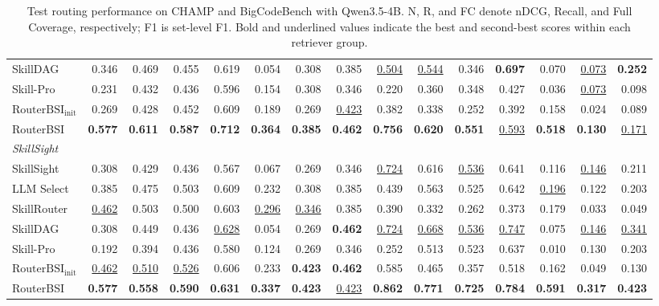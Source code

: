 \begin{table}[t]
\begin{tabular*}{\textwidth}{@{\extracolsep{\fill}}lrrrrrrrrrrrrrr@{}}
SkillDAG & 0.346 & 0.469 & 0.455 & 0.619 & 0.054 & 0.308 & 0.385 & \underline{0.504} & \underline{0.544} & 0.346 & \textbf{0.697} & 0.070 & \underline{0.073} & \textbf{0.252} \\
Skill-Pro & 0.231 & 0.432 & 0.436 & 0.596 & 0.154 & 0.308 & 0.346 & 0.220 & 0.360 & 0.348 & 0.427 & 0.036 & \underline{0.073} & 0.098 \\
$\mathrm{RouterBSI}_{\mathrm{init}}$ & 0.269 & 0.428 & 0.452 & 0.609 & 0.189 & 0.269 & \underline{0.423} & 0.382 & 0.338 & 0.252 & 0.392 & 0.158 & 0.024 & 0.089 \\
RouterBSI & \textbf{0.577} & \textbf{0.611} & \textbf{0.587} & \textbf{0.712} & \textbf{0.364} & \textbf{0.385} & \textbf{0.462} & \textbf{0.756} & \textbf{0.620} & \textbf{0.551} & \underline{0.593} & \textbf{0.518} & \textbf{0.130} & \underline{0.171} \\
\midrule
\multicolumn{15}{l}{\textit{SkillSight}} \\
\midrule
SkillSight & 0.308 & 0.429 & 0.436 & 0.567 & 0.067 & 0.269 & 0.346 & \underline{0.724} & 0.616 & \underline{0.536} & 0.641 & 0.116 & \underline{0.146} & 0.211 \\
LLM Select & 0.385 & 0.475 & 0.503 & 0.609 & 0.232 & 0.308 & 0.385 & 0.439 & 0.563 & 0.525 & 0.642 & \underline{0.196} & 0.122 & 0.203 \\
SkillRouter & \underline{0.462} & 0.503 & 0.500 & 0.603 & \underline{0.296} & \underline{0.346} & 0.385 & 0.390 & 0.332 & 0.262 & 0.373 & 0.179 & 0.033 & 0.049 \\
SkillDAG & 0.308 & 0.449 & 0.436 & \underline{0.628} & 0.054 & 0.269 & \textbf{0.462} & \underline{0.724} & \underline{0.668} & \underline{0.536} & \underline{0.747} & 0.075 & \underline{0.146} & \underline{0.341} \\
Skill-Pro & 0.192 & 0.394 & 0.436 & 0.580 & 0.124 & 0.269 & 0.346 & 0.252 & 0.513 & 0.523 & 0.637 & 0.010 & 0.130 & 0.203 \\
$\mathrm{RouterBSI}_{\mathrm{init}}$ & \underline{0.462} & \underline{0.510} & \underline{0.526} & 0.606 & 0.233 & \textbf{0.423} & \textbf{0.462} & 0.585 & 0.465 & 0.357 & 0.518 & 0.162 & 0.049 & 0.130 \\
RouterBSI & \textbf{0.577} & \textbf{0.558} & \textbf{0.590} & \textbf{0.631} & \textbf{0.337} & \textbf{0.423} & \underline{0.423} & \textbf{0.862} & \textbf{0.771} & \textbf{0.725} & \textbf{0.784} & \textbf{0.591} & \textbf{0.317} & \textbf{0.423} \\
\bottomrule
\end{tabular*}
\caption{Test routing performance on CHAMP and BigCodeBench with Qwen3.5-4B. N, R, and FC denote nDCG, Recall, and Full Coverage, respectively; F1 is set-level F1. Bold and underlined values indicate the best and second-best scores within each retriever group.}
\label{tab:app-routing-3}
\end{table}
